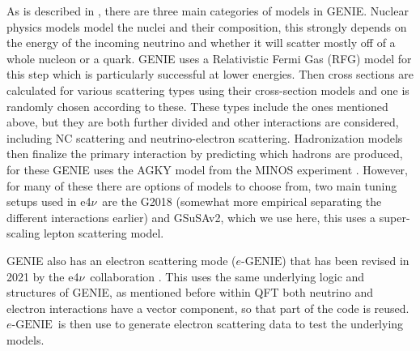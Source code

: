 \documentclass[a4paper,12pt]{article}
\newcommand{\efn}{e4$\nu$}
\newcommand{\eGEN}{$e\text{-GENIE}$}
\begin{document}
As is described in \cite{andreopoulosGENIENeutrinoMonte2010}, there are three main categories of models in GENIE.
Nuclear physics models model the nuclei and their composition, this strongly depends on the energy of the incoming neutrino and whether it will scatter mostly off of a whole nucleon or a quark.
GENIE uses a Relativistic Fermi Gas (RFG) model for this step which is particularly successful at lower energies.
Then cross sections are calculated for various scattering types using their cross-section models and one is randomly chosen according to these.
These types include the ones mentioned above, but they are both further divided and other interactions are considered, including NC scattering and neutrino-electron scattering.
Hadronization models then finalize the primary interaction by predicting which hadrons are produced, for these GENIE uses the AGKY model from the MINOS experiment \cite{HadronizationModelMINOS}.
However, for many of these there are options of models to choose from, two main tuning setups used in \efn\ are the G2018 (somewhat more empirical separating the different interactions earlier) and GSuSAv2, which we use here, this uses a super-scaling lepton scattering model\cite{amaroNeutrinonucleusScatteringSuSA2021}.

GENIE also has an electron scattering mode (\eGEN) that has been revised in 2021 by the \efn\ collaboration \cite{e4ncollaborationInclusiveElectronScattering2021}.
This uses the same underlying logic and structures of GENIE, as mentioned before within QFT both neutrino and electron interactions have a vector component, so that part of the code is reused.
\eGEN\ is then use to generate electron scattering data to test the underlying models.
\end{document}
